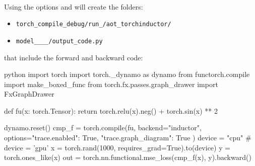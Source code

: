 \begin{examplebox}\nospacing
    \begin{example}\label{example:torchinductor}\leavevmode\\
        Using the options  and  will create the folders:
        \begin{itemize}
            \item \texttt{torch\_compile\_debug/run\_/aot\_torchinductor/}
            \item \texttt{model\_\_\_\_/output\_code.py}
        \end{itemize}
        that include the forward and backward code:
        \begin{plaincodebox}{python}
        import torch
        import torch._dynamo as dynamo
        from functorch.compile import make_boxed_func
        from torch.fx.passes.graph_drawer import FxGraphDrawer

        def fu(x: torch.Tensor):
            return torch.relu(x).neg() + torch.sin(x) ** 2

        dynamo.reset()
        cmp_f = torch.compile(fu,
            backend="inductor",
            options={"trace.enabled": True, "trace.graph_diagram": True}
        )
        device = "cpu" # device = 'gpu'
        x = torch.rand(1000, requires_grad=True).to(device)
        y = torch.ones_like(x)
        out = torch.nn.functional.mse_loss(cmp_f(x), y).backward()
        \end{plaincodebox}
    \end{example}
\end{examplebox}
